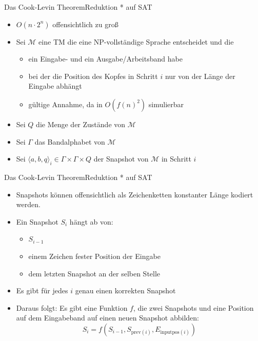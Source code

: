 \documentclass[ignorenonframetext,]{beamer}
\begin{document}
\begin{frame}{Das Cook-Levin Theorem}{Reduktion * auf SAT}

\begin{itemize}
\itemsep1pt\parskip0pt
\item
  $O(n \cdot 2^n)$ offensichtlich zu groß
\item
  Sei $\mathcal{M}$ eine TM die eine NP-vollständige Sprache entscheidet
  und die

  \begin{itemize}
  \itemsep1pt\parskip0pt
  \item
    ein Eingabe- und ein Ausgabe/Arbeitsband habe
  \item
    bei der die Position des Kopfes in Schritt $i$ nur von der Länge der
    Eingabe abhängt
  \item
    gültige Annahme, da in $O(f(n)^2)$ simulierbar
  \end{itemize}
\item
  Sei $Q$ die Menge der Zustände von $\mathcal{M}$
\item
  Sei $\Gamma$ das Bandalphabet von $\mathcal{M}$
\item
  Sei $\langle a, b, q\rangle_i \in \Gamma\times \Gamma\times Q$ der
  Snapshot von $\mathcal{M}$ in Schritt $i$
\end{itemize}

\end{frame}

\begin{frame}{Das Cook-Levin Theorem}{Reduktion * auf SAT}

\begin{itemize}
\itemsep1pt\parskip0pt
\item
  Snapshots können offensichtlich als Zeichenketten konstanter Länge
  kodiert werden.
\item
  Ein Snapshot $S_i$ hängt ab von:

  \begin{itemize}
  \itemsep1pt\parskip0pt
  \item
    $S_{i-1}$
  \item
    einem Zeichen fester Position der Eingabe
  \item
    dem letzten Snapshot an der selben Stelle
  \end{itemize}
\item
  Es gibt für jedes $i$ genau einen korrekten Snapshot
\item
  Daraus folgt: Es gibt eine Funktion $f$, die zwei Snapshots und eine
  Position auf dem Eingabeband auf einen neuen Snapshot abbilden:
  \[S_i = f(S_{i-1}, S_{\mathrm{prev}(i)}, E_{\mathrm{inputpos}(i)})\]
\end{itemize}

\end{frame}
\end{document}
